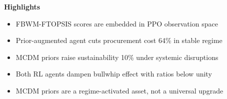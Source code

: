 \documentclass[12pt]{article}
\begin{document}
\noindent\textbf{Highlights}

\begin{itemize}
\item FBWM-FTOPSIS scores are embedded in PPO observation space           %
\item Prior-augmented agent cuts procurement cost 64\% in stable regime   %
\item MCDM priors raise sustainability 10\% under systemic disruptions    %
\item Both RL agents dampen bullwhip effect with ratios below unity       %
\item MCDM priors are a regime-activated asset, not a universal upgrade   %
\end{itemize}
\end{document}
